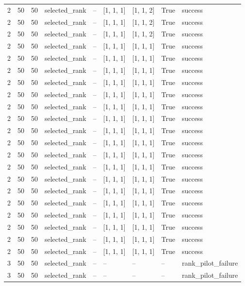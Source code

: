 \begin{longtable}{lllllllll}
2 & 50 & 50 & selected\_rank & -- & [1, 1, 1] & [1, 1, 2] & True & success \\
2 & 50 & 50 & selected\_rank & -- & [1, 1, 1] & [1, 1, 2] & True & success \\
2 & 50 & 50 & selected\_rank & -- & [1, 1, 1] & [1, 1, 2] & True & success \\
2 & 50 & 50 & selected\_rank & -- & [1, 1, 1] & [1, 1, 1] & True & success \\
2 & 50 & 50 & selected\_rank & -- & [1, 1, 1] & [1, 1, 1] & True & success \\
2 & 50 & 50 & selected\_rank & -- & [1, 1, 1] & [1, 1, 1] & True & success \\
2 & 50 & 50 & selected\_rank & -- & [1, 1, 1] & [1, 1, 1] & True & success \\
2 & 50 & 50 & selected\_rank & -- & [1, 1, 1] & [1, 1, 1] & True & success \\
2 & 50 & 50 & selected\_rank & -- & [1, 1, 1] & [1, 1, 1] & True & success \\
2 & 50 & 50 & selected\_rank & -- & [1, 1, 1] & [1, 1, 1] & True & success \\
2 & 50 & 50 & selected\_rank & -- & [1, 1, 1] & [1, 1, 1] & True & success \\
2 & 50 & 50 & selected\_rank & -- & [1, 1, 1] & [1, 1, 1] & True & success \\
2 & 50 & 50 & selected\_rank & -- & [1, 1, 1] & [1, 1, 1] & True & success \\
2 & 50 & 50 & selected\_rank & -- & [1, 1, 1] & [1, 1, 1] & True & success \\
2 & 50 & 50 & selected\_rank & -- & [1, 1, 1] & [1, 1, 1] & True & success \\
2 & 50 & 50 & selected\_rank & -- & [1, 1, 1] & [1, 1, 1] & True & success \\
2 & 50 & 50 & selected\_rank & -- & [1, 1, 1] & [1, 1, 1] & True & success \\
2 & 50 & 50 & selected\_rank & -- & [1, 1, 1] & [1, 1, 1] & True & success \\
2 & 50 & 50 & selected\_rank & -- & [1, 1, 1] & [1, 1, 1] & True & success \\
2 & 50 & 50 & selected\_rank & -- & [1, 1, 1] & [1, 1, 1] & True & success \\
2 & 50 & 50 & selected\_rank & -- & [1, 1, 1] & [1, 1, 1] & True & success \\
3 & 50 & 50 & selected\_rank & -- & -- & -- & -- & rank\_pilot\_failure \\
3 & 50 & 50 & selected\_rank & -- & -- & -- & -- & rank\_pilot\_failure \\

\end{longtable}

